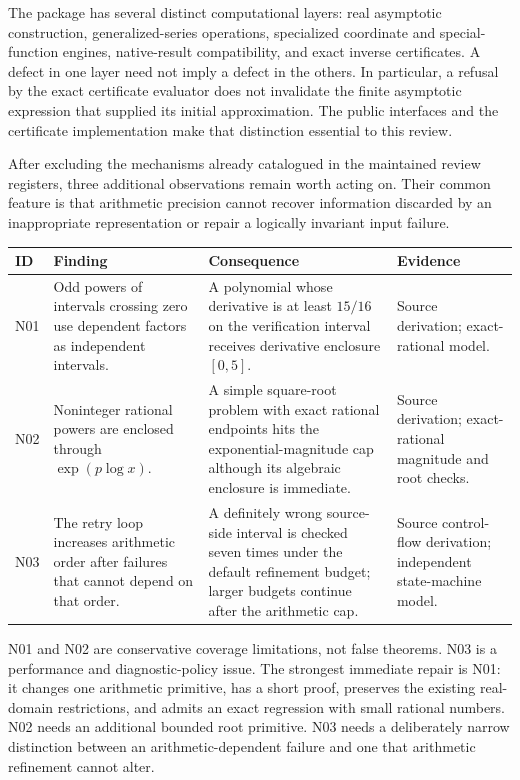 \documentclass[11pt,a4paper]{article}
\begin{document}
The package has several distinct computational layers: real asymptotic construction, generalized-series operations, specialized coordinate and special-function engines, native-result compatibility, and exact inverse certificates. A defect in one layer need not imply a defect in the others. In particular, a refusal by the exact certificate evaluator does not invalidate the finite asymptotic expression that supplied its initial approximation. The public interfaces and the certificate implementation make that distinction essential to this review.\cite{core,cert}

After excluding the mechanisms already catalogued in the maintained review registers, three additional observations remain worth acting on. Their common feature is that arithmetic precision cannot recover information discarded by an inappropriate representation or repair a logically invariant input failure.

\begin{longtable}{@{}>{\raggedright\arraybackslash}p{}>{\raggedright\arraybackslash}p{}>{\raggedright\arraybackslash}p{}>{\raggedright\arraybackslash}p{}@{}}
\toprule
ID & Finding & Consequence & Evidence\\
\midrule
N01 & Odd powers of intervals crossing zero use dependent factors as independent intervals. & A polynomial whose derivative is at least $15/16$ on the verification interval receives derivative enclosure $[0,5]$. & Source derivation; exact-rational model.\\[4pt]
N02 & Noninteger rational powers are enclosed through $\exp(p\log x)$. & A simple square-root problem with exact rational endpoints hits the exponential-magnitude cap although its algebraic enclosure is immediate. & Source derivation; exact-rational magnitude and root checks.\\[4pt]
N03 & The retry loop increases arithmetic order after failures that cannot depend on that order. & A definitely wrong source-side interval is checked seven times under the default refinement budget; larger budgets continue after the arithmetic cap. & Source control-flow derivation; independent state-machine model.\\
\bottomrule
\end{longtable}

N01 and N02 are conservative coverage limitations, not false theorems. N03 is a performance and diagnostic-policy issue. The strongest immediate repair is N01: it changes one arithmetic primitive, has a short proof, preserves the existing real-domain restrictions, and admits an exact regression with small rational numbers. N02 needs an additional bounded root primitive. N03 needs a deliberately narrow distinction between an arithmetic-dependent failure and one that arithmetic refinement cannot alter.
\end{document}
